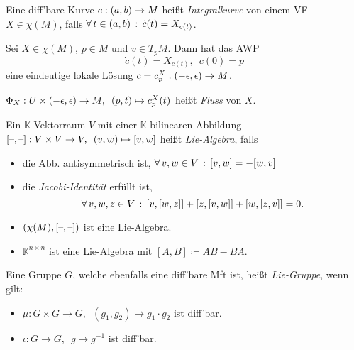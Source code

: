 \documentclass{cheat-sheet}
\newcommand{\K}{\mathbb{K}} %
\newcommand{\vinterval}{\ointerval{-\epsilon}{\epsilon}} %
\begin{document}

\begin{defn}
  Eine diff'bare Kurve $c : \left( a, b \right) \to M$ heißt \emph{Integralkurve} von einem VF $X \in \chi(M)$, falls
  $\forall \, {t \in \left( a, b \right)} \,:\, \dot{c}(t) = X_{c(t)}$.
\end{defn}

\begin{lem}
  Sei $X \in \chi(M)$, $p \in M$ und $v \in T_p M$. Dann hat das AWP
  \[ \dot{c}(t) = X_{c(t)}, \enspace c(0) = p \]
  eine eindeutige lokale Lösung $c = c_p^X : \vinterval \to M$.
\end{lem}

\begin{defn}
  $\Phi_X : U \times \vinterval \to M, \enspace (p, t) \mapsto c_p^X(t)$ heißt \emph{Fluss} von $X$.
\end{defn}


\begin{defn}
  Ein $\K$-Vektorraum $V$ mit einer $\K$-bilinearen Abbildung $[\text{--},\text{--}] : V \times V \to V, \enspace (v, w) \mapsto [v,w]$ heißt \emph{Lie-Algebra}, falls
  \begin{itemize}
    \item die Abb. antisymmetrisch ist, \dh{} $\forall \, {v, w \in V} \,:\, [v, w] = - [w, v]$
    \item die \emph{Jacobi-Identität} erfüllt ist, \dh{}
    \[ \forall \, {v,w,z \in V} \,:\, [v, [w, z]] + [z, [v, w]] + [w, [z, v]] = 0. \]
  \end{itemize}
\end{defn}

\begin{bspe}
  \begin{itemize}
    \item $(\chi(M), [\text{--},\text{--}])$ ist eine Lie-Algebra.
    \item $\K^{n \times n}$ ist eine Lie-Algebra mit $[A, B] \coloneqq AB - BA$.
  \end{itemize}
\end{bspe}

\begin{defn}
  Eine Gruppe $G$, welche ebenfalls eine diff'bare Mft ist, heißt \emph{Lie-Gruppe}, wenn gilt:
  \begin{itemize}
    \item $\mu : G \times G \to G, \enspace (g_1, g_2) \mapsto g_1 \cdot g_2$ ist diff'bar.
    \item $\iota : G \to G, \enspace g \mapsto g^{-1}$ ist diff'bar.
  \end{itemize}
\end{defn}
\end{document}
